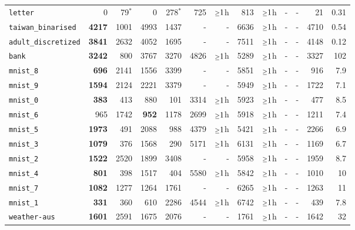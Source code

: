 \begin{tabular}{lrrrrrrrrrrrr}
\texttt{letter} & 0 & 79$^*$ & 0 & 278$^*$ & 725 & $\mathsmaller{\geq}1$h & 813 & $\mathsmaller{\geq}1$h & - & - & 21 & 0.31\\
\texttt{taiwan\_binarised} & \textbf{4217} & 1001 & 4993 & 1437 & - & - & 6636 & $\mathsmaller{\geq}1$h & - & - & 4710 & 0.54\\
\texttt{adult\_discretized} & \textbf{3841} & 2632 & 4052 & 1695 & - & - & 7511 & $\mathsmaller{\geq}1$h & - & - & 4148 & 0.12\\
\texttt{bank} & \textbf{3242} & 800 & 3767 & 3270 & 4826 & $\mathsmaller{\geq}1$h & 5289 & $\mathsmaller{\geq}1$h & - & - & 3327 & 102\\
\texttt{mnist\_8} & \textbf{696} & 2141 & 1556 & 3399 & - & - & 5851 & $\mathsmaller{\geq}1$h & - & - & 916 & 7.9\\
\texttt{mnist\_9} & \textbf{1594} & 2124 & 2221 & 3379 & - & - & 5949 & $\mathsmaller{\geq}1$h & - & - & 1722 & 7.1\\
\texttt{mnist\_0} & \textbf{383} & 413 & 880 & 101 & 3314 & $\mathsmaller{\geq}1$h & 5923 & $\mathsmaller{\geq}1$h & - & - & 477 & 8.5\\
\texttt{mnist\_6} & 965 & 1742 & \textbf{952} & 1178 & 2699 & $\mathsmaller{\geq}1$h & 5918 & $\mathsmaller{\geq}1$h & - & - & 1211 & 7.4\\
\texttt{mnist\_5} & \textbf{1973} & 491 & 2088 & 988 & 4379 & $\mathsmaller{\geq}1$h & 5421 & $\mathsmaller{\geq}1$h & - & - & 2266 & 6.9\\
\texttt{mnist\_3} & \textbf{1079} & 376 & 1568 & 290 & 5171 & $\mathsmaller{\geq}1$h & 6131 & $\mathsmaller{\geq}1$h & - & - & 1169 & 6.7\\
\texttt{mnist\_2} & \textbf{1522} & 2520 & 1899 & 3408 & - & - & 5958 & $\mathsmaller{\geq}1$h & - & - & 1959 & 8.7\\
\texttt{mnist\_4} & \textbf{801} & 398 & 1517 & 404 & 5580 & $\mathsmaller{\geq}1$h & 5842 & $\mathsmaller{\geq}1$h & - & - & 1010 & 10\\
\texttt{mnist\_7} & \textbf{1082} & 1277 & 1264 & 1761 & - & - & 6265 & $\mathsmaller{\geq}1$h & - & - & 1263 & 11\\
\texttt{mnist\_1} & \textbf{331} & 360 & 610 & 2286 & 4544 & $\mathsmaller{\geq}1$h & 6742 & $\mathsmaller{\geq}1$h & - & - & 439 & 7.8\\
\texttt{weather-aus} & \textbf{1601} & 2591 & 1675 & 2076 & - & - & 1761 & $\mathsmaller{\geq}1$h & - & - & 1642 & 32\\
\bottomrule
\end{tabular}
